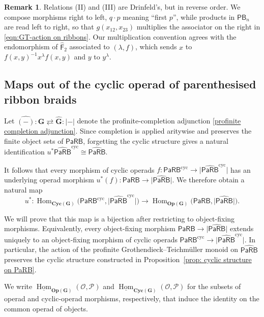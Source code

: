 \documentclass{amsart}
\newcommand{\calO}{\mathcal{O}}
\newcommand{\Grpd}{\mathbf{G}}
\newcommand{\PaRB}{\mathsf{PaRB}}
\newcommand{\calP}{\mathcal{P}}
\newcommand{\Cyc}{\mathbf{Cyc}}
\newcommand{\Op}{\mathbf{Op}}
\newcommand{\Hom}{\operatorname{Hom}}
\newcommand{\PB}{\mathsf{PB}} %
\newcommand{\Free}{\mathsf{F}} %
\theoremstyle{definition}
\newtheorem{remark}[theorem]{Remark}%
\numberwithin{equation}{section}
\begin{document}
\begin{remark}\label{rem:GT-convention}
Relations (II) and (III) are Drinfeld’s, but in reverse order. We compose morphisms
right to left, $q\cdot p$ meaning ``first $p$'', while products in $\PB_n$ are read left to
right, so that $g(x_{12},x_{23})$ multiplies the associator on the right in
\eqref{eqn:GT-action on ribbons}. 
Our multiplication convention agrees  with the endomorphism of
$\widehat{\Free}_2$ associated to $(\lambda,f)$, which sends
$x$ to $f(x,y)^{-1}x^\lambda f(x,y)$ and $y$ to $y^\lambda$.
\end{remark}

\subsection{Maps out of the cyclic operad of parenthesised ribbon
braids}
\label{subsec: maps out of cyclic PaRB}

Let
$\widehat{(-)}\colon
\Grpd\rightleftarrows\widehat{\Grpd}:|-|$
denote the profinite-completion adjunction
\eqref{profinite completion adjunction}. Since completion is applied
aritywise and preserves the finite object sets of $\PaRB$, forgetting
the cyclic structure gives a natural identification
$u^*\widehat{\PaRB}^{\mathrm{cyc}}\cong\widehat{\PaRB}$.

It follows that every morphism of cyclic operads
$f\colon\PaRB^{\mathrm{cyc}}\to
\lvert\widehat{\PaRB}^{\mathrm{cyc}}\rvert$
has an underlying operad morphism
$u^*(f)\colon\PaRB\to\lvert\widehat{\PaRB}\rvert$. We therefore
obtain a natural map
\[
u^*\colon
\Hom_{\Cyc(\Grpd)}
\bigl(
\PaRB^{\mathrm{cyc}},
\lvert\widehat{\PaRB}^{\mathrm{cyc}}\rvert
\bigr)
\longrightarrow
\Hom_{\Op(\Grpd)}
\bigl(
\PaRB,
\lvert\widehat{\PaRB}\rvert
\bigr).
\]

We will prove that this map is a bijection after restricting to
object-fixing morphisms. Equivalently, every object-fixing morphism
$\PaRB\to\lvert\widehat{\PaRB}\rvert$ extends uniquely to an
object-fixing morphism of cyclic operads
$\PaRB^{\mathrm{cyc}}\to
\lvert\widehat{\PaRB}^{\mathrm{cyc}}\rvert$. In particular, the
action of the profinite Grothendieck--Teichmüller monoid on
$\widehat{\PaRB}$ preserves the cyclic structure constructed in
Proposition~\ref{prop: cyclic structure on PaRB}.

We write $\underline{\Hom}_{\Op(\Grpd)}(\calO,\calP)$ and
$\underline{\Hom}_{\Cyc(\Grpd)}(\calO,\calP)$ for the subsets of operad and
cyclic-operad morphisms, respectively, that induce the identity on
the common operad of objects.
\end{document}
